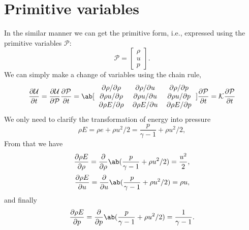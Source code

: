 \documentclass[justified, nobib]{tufte-handout}
\begin{document}
\section{Primitive variables}
\def\P{\mathcal{P}}
In the similar manner we can get the primitive form, i.e., expressed
using the primitive variables \(\P\):
\[
	\P = \left[
		\begin{array}{c}
			\rho \\
			u    \\
			p
		\end{array}
		\right].
\]
\def\K{\mathcal{K}}
We can simply make a change of variables using the chain rule,
\[
	\pdv{\U}{t} = \pdv{\U}{\P}\pdv{\P}{t} =
	\ab[
		\begin{array}{ccc}
			\pdv{\rho  }/{\rho} & \pdv{\rho  }/{u} & \pdv{\rho  }/{p} \\
			\pdv{\rho u}/{\rho} & \pdv{\rho u}/{u} & \pdv{\rho u}/{p} \\
			\pdv{\rho E}/{\rho} & \pdv{\rho E}/{u} & \pdv{\rho E}/{p}
		\end{array}
	] \pdv{\P}{t} = \K\pdv{\P}{t}
\]
We only need to clarify the transformation of
energy into pressure
\[
	\rho E = \rho e + \rho u^2/2 = \frac{p}{\gamma -1 } + \rho u^2/2,
\]
From that we have
\[
	\pdv{\rho E}{\rho} = \pdv{}{\rho}\ab(\frac{p}{\gamma -1 } + \rho u^2/2)
	= \frac{u^2}{2},
\]
\[
	\pdv{\rho E}{u} = \pdv{}{u}\ab(\frac{p}{\gamma -1 } + \rho u^2/2)
	= \rho u,
\]
and finally
\[
	\pdv{\rho E}{p} = \pdv{}{p}\ab(\frac{p}{\gamma -1 } + \rho u^2/2)
	= \frac{1}{\gamma -1}.
\]
\end{document}
